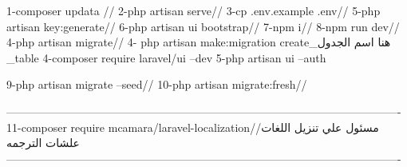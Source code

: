 1-composer updata //
2-php artisan serve//
3-cp .env.example .env//
5-php artisan key:generate//
6-php artisan ui bootstrap//
7-npm i//
8-npm run dev//
4-php artisan migrate//
4- php artisan make:migration create_هنا اسم الجدول _table
4-composer require laravel/ui --dev
5-php artisan ui --auth

9-php artisan migrate --seed//
10-php artisan migrate:fresh//

----------------------------------------------------------------------------------------------------------
11-composer require mcamara/laravel-localization//مسئول علي تنزيل اللغات علشات الترجمه 
----------------------------------------------------------------------------------------------------------


